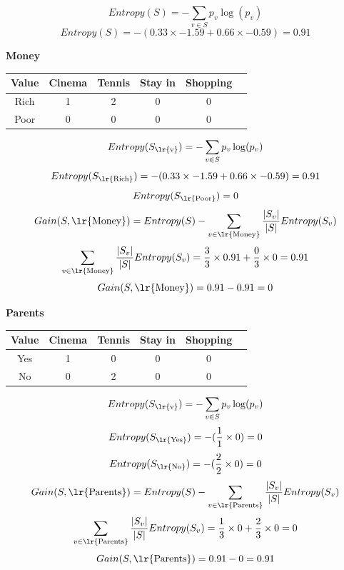 \documentclass{article}
\newcommand{\tf}[1]{\text{\lr{#1}}}
\begin{document}
	\vspace{5pt}
	\[
	Entropy(S) = -\sum_{v \in S} p_v\log (p_v)
	\]
	\[
	Entropy(S) = -( 0.33 \times -1.59 + 0.66 \times -0.59) = 0.91
	\]
	\begin{latin}
		\textbf{Money}
		\begin{center}
			\begin{tabular}{|c|c|c|c|c|c|}
				\hline
				Value & Cinema & Tennis & Stay in & Shopping\\
				\hline
				\hline
				Rich &1& 2 & 0 &0\\
				\hline
				Poor & 0 & 0 & 0 & 0\\
				\hline
			\end{tabular}
		\end{center}
	\end{latin}
	\vspace{5pt}
	\[
	Entropy(S_{\text{\lr{v}}}) = -\sum_{v \in S} p_v\log (p_v)
	\]
	\[
	Entropy(S_{\tf{Rich}}) = -( 0.33 \times -1.59 + 0.66 \times -0.59) = 0.91
	\]
	\[
	Entropy(S_{\tf{Poor}}) = 0
	\]
	\vspace{10pt}
	\[
	Gain(S, \tf{Money}) = Entropy(S) - \sum_{v \in \tf{Money}} \frac{| S_v |}{| S |}Entropy(S_v)
	\] 
	\[
	\sum_{v \in \tf{Money}} \frac{| S_v |}{| S |}Entropy(S_v) = \frac{3}{3} \times 0.91 + \frac{0}{3} \times 0 = 0.91
	\]
	\[
	Gain(S, \tf{Money}) = 0.91 - 0.91 = 0
	\]
	\begin{latin}
		\textbf{Parents}
		\begin{center}
			\begin{tabular}{|c|c|c|c|c|c|}
				\hline
				Value & Cinema & Tennis & Stay in & Shopping\\
				\hline
				\hline
				Yes & 1 & 0 & 0 & 0\\
				\hline
				No & 0 & 2 & 0 & 0\\
				\hline
			\end{tabular}
		\end{center}
	\end{latin}
	\vspace{5pt}
	\[
	Entropy(S_{\tf{v}}) = -\sum_{v \in S} p_v\log (p_v)
	\]
	\[
	Entropy(S_{\tf{Yes}}) = -(\frac{1}{1} \times 0) = 0
	\]
	\[
	Entropy(S_{\tf{No}}) = -(\frac{2}{2} \times 0) = 0
	\]
	\vspace{10pt}
	\[
	Gain(S, \tf{Parents}) = Entropy(S) - \sum_{v \in \tf{Parents}} \frac{| S_v |}{| S |}Entropy(S_v)
	\] 
	\[
	\sum_{v \in \tf{Parents}} \frac{| S_v |}{| S |}Entropy(S_v) = \frac{1}{3} \times 0 + \frac{2}{3} \times 0 = 0
	\]
	\[
	Gain(S, \tf{Parents}) = 0.91 - 0 = 0.91
	\]
\end{document}

